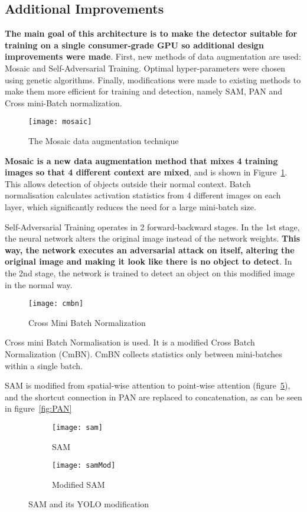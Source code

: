 \subsection{Additional Improvements}
\textbf{The main goal of this architecture is to make the detector suitable for training on a single consumer-grade GPU so additional design improvements were made}. First, new methods of data augmentation are used: Mosaic and Self-Adversarial Training. Optimal hyper-parameters were chosen using genetic algorithms. Finally, modifications were made to existing methods to make them more efficient for training and detection, namely SAM, PAN and Cross mini-Batch normalization.

\begin{figure}[H]
  \centering
  \texttt{[image: mosaic]}
	\caption[]{The Mosaic data augmentation technique}
  \label{fig:mosaic}
\end{figure}

\textbf{Mosaic is a new data augmentation method that mixes 4 training images so that 4 different context are mixed}, and is shown in Figure~\ref{fig:mosaic}. This allows detection of objects outside their normal context. Batch normalisation calculates activation statistics from 4 different images on each layer, which significantly reduces the need for a large mini-batch size.

Self-Adversarial Training operates in 2 forward-backward stages. In the 1st stage, the neural network alters the original image instead of the network weights. \textbf{This way, the network executes an adversarial attack on itself, altering the original image and making it look like there is no object to detect}. In the 2nd stage, the network is trained to detect an object on this modified image in the normal way.

\begin{figure}[H]
  \centering
  \texttt{[image: cmbn]}
	\caption[]{Cross Mini Batch Normalization}
  \label{}
\end{figure}

Cross mini Batch Normalisation is used. It is a modified Cross Batch Normalization (CmBN). CmBN collects statistics only between mini-batches within a single batch. 

SAM is modified from spatial-wise attention to point-wise attention (figure~\ref{fig:SAM}), and the shortcut connection in PAN are replaced to concatenation, as can be seen in figure~\ref{fig:PAN}

\begin{figure}[H]
     \centering
     \begin{subfigure}[b]{0.4\textwidth}
         \centering
         \texttt{[image: sam]}
         \caption{SAM}
         \label{fig:samnorm}
     \end{subfigure}
     \begin{subfigure}[b]{0.4\textwidth}
         \centering
         \texttt{[image: samMod]}
         \caption{Modified SAM}
         \label{fig:samod}
     \end{subfigure}
   \caption{SAM and its YOLO modification}
  \label{fig:SAM}
\end{figure}

